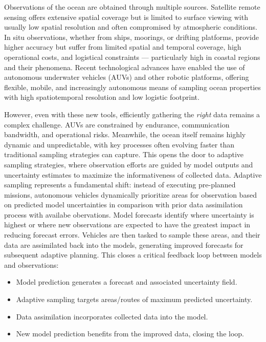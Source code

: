 Observations of the ocean are obtained through multiple sources. Satellite remote sensing offers extensive spatial coverage but is limited to surface viewing with usually low spatial resolution and often compromised by atmospheric conditions. In situ observations, whether from ships, moorings, or drifting platforms, provide higher accuracy but suffer from limited spatial and temporal coverage, high operational costs, and logistical constraints — particularly high in coastal regions and their phenomena. Recent technological advances have enabled the use of autonomous underwater vehicles (AUVs) and other robotic platforms, offering flexible, mobile, and increasingly autonomous means of sampling ocean properties with high spatiotemporal resolution and low logistic footprint.

However, even with these new tools, efficiently gathering the \textit{right} data remains a complex challenge. AUVs are constrained by endurance, communication bandwidth, and operational risks. Meanwhile, the ocean itself remains highly dynamic and unpredictable, with key processes often evolving faster than traditional sampling strategies can capture. This opens the door to adaptive sampling strategies, where observation efforts are guided by model outputs and uncertainty estimates to maximize the informativeness of collected data. Adaptive sampling represents a fundamental shift: instead of executing pre-planned missions, autonomous vehicles dynamically prioritize areas for observation based on predicted model uncertainties in comparison with prior data assimilation process with availabe obervations. Model forecasts identify where uncertainty is highest or where new observations are expected to have the greatest impact in reducing forecast errors. Vehicles are then tasked to sample these areas, and their data are assimilated back into the models, generating improved forecasts for subsequent adaptive planning.
This closes a critical feedback loop between models and observations:
\begin{itemize}
    \item Model prediction generates a forecast and associated uncertainty field.
    \item Adaptive sampling targets areas/routes of maximum predicted uncertainty.
    \item Data assimilation incorporates collected data into the model.
    \item New model prediction benefits from the improved data, closing the loop.
\end{itemize}

